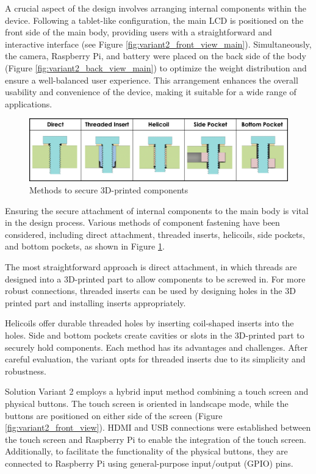 A crucial aspect of the design involves arranging internal components within the device. Following a tablet-like configuration, the main LCD is positioned on the front side of the main body, providing users with a straightforward and interactive interface (see Figure \ref{fig:variant2_front_view_main}). Simultaneously, the camera, Raspberry Pi, and battery were placed on the back side of the body (Figure \ref{fig:variant2_back_view_main}) to optimize the weight distribution and ensure a well-balanced user experience. This arrangement enhances the overall usability and convenience of the device, making it suitable for a wide range of applications.

\begin{figure}[ht!]
    \centering
    \includegraphics[width=\linewidth]{texs/Part1/chapter4/image/insert.png}
    \caption{Methods to secure 3D-printed components \cite{Hermann20}}
    \label{fig:insert}
\end{figure}

Ensuring the secure attachment of internal components to the main body is vital in the design process. Various methods of component fastening have been considered, including direct attachment, threaded inserts, helicoils, side pockets, and bottom pockets, as shown in Figure \ref{fig:insert}.

The most straightforward approach is direct attachment, in which threads are designed into a 3D-printed part to allow components to be screwed in. For more robust connections, threaded inserts can be used by designing holes in the 3D printed part and installing inserts appropriately.

Helicoils offer durable threaded holes by inserting coil-shaped inserts into the holes. Side and bottom pockets create cavities or slots in the 3D-printed part to securely hold components. Each method has its advantages and challenges. After careful evaluation, the variant opts for threaded inserts due to its simplicity and robustness.

Solution Variant 2 employs a hybrid input method combining a touch screen and physical buttons. The touch screen is oriented in landscape mode, while the buttons are positioned on either side of the screen (Figure \ref{fig:variant2_front_view}). HDMI and USB connections were established between the touch screen and Raspberry Pi to enable the integration of the touch screen. Additionally, to facilitate the functionality of the physical buttons, they are connected to Raspberry Pi using general-purpose input/output  (GPIO) pins.

